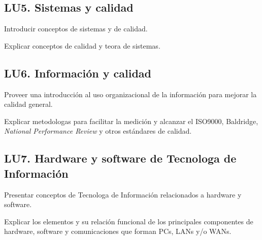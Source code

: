 \subsection{LU5. Sistemas y calidad}\label{sec:LU5}
\begin{LearningUnit}
\begin{LUGoal}
\item Introducir conceptos de sistemas y de calidad.
\end{LUGoal}

\begin{LUObjective}
\item Explicar conceptos de calidad y teor­a de sistemas.
\end{LUObjective}
\end{LearningUnit}

\subsection{LU6. Información y calidad}\label{sec:LU6}
\begin{LearningUnit}
\begin{LUGoal}
\item Proveer una introducción al uso organizacional de la información para mejorar la calidad general.
\end{LUGoal}

\begin{LUObjective}
\item Explicar metodolog­as para facilitar la medición y alcanzar el ISO9000, Baldridge, {\it National Performance Review} y otros estándares de calidad.
\end{LUObjective}
\end{LearningUnit}

\subsection{LU7. Hardware y software de Tecnolog­a de Información}\label{sec:LU7}
\begin{LearningUnit}
\begin{LUGoal}
\item Presentar conceptos de Tecnolog­a de Información relacionados a hardware y software.
\end{LUGoal}

\begin{LUObjective}
\item Explicar los elementos y su relación funcional de los principales componentes de hardware, software y comunicaciones que forman PCs, LANs y/o WANs.
\end{LUObjective}
\end{LearningUnit}

